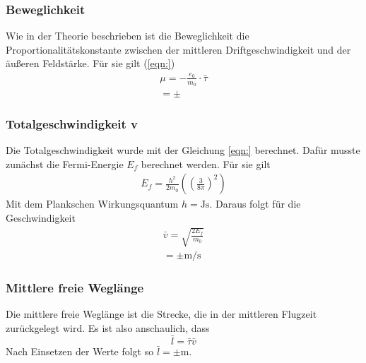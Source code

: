 \subsubsection{Beweglichkeit}

Wie in der Theorie beschrieben ist die Beweglichkeit die Proportionalitätskonstante zwischen 
der mittleren Driftgeschwindigkeit und der äußeren Feldstärke. Für sie gilt (\eqref{eqn:})
\begin{align*}
\mu = -\frac{e_0}{m_0} \cdot \bar{\tau} \\
= \pm
\end{align*}

\subsubsection{Totalgeschwindigkeit v}

Die Totalgeschwindigkeit wurde mit der Gleichung \eqref{eqn:} berechnet.
Dafür musste zunächst die Fermi-Energie $E_f$ berechnet werden. Für sie gilt
\begin{align}
E_f = \frac{h^2}{2 m_0} \left( \left( \frac{3}{8 \pi} \right)^2 \right)
\end{align}
Mit dem Plankschen Wirkungsquantum $h = \si{\joule\s}$.
Daraus folgt für die Geschwindigkeit
\begin{align*}
\bar{v} = \sqrt{ \frac{2 E_f}{m_0}} \\
= \pm \si{\m\per\s}
\end{align*}

\subsubsection{Mittlere freie Weglänge}

Die mittlere freie Weglänge ist die Strecke, die in der mittleren Flugzeit
zurückgelegt wird. Es ist also anschaulich, dass 
\begin{equation}
\bar{l} = \bar{ \tau } \bar{v}
\end{equation}
Nach Einsetzen der Werte folgt so $\bar{l} = \pm \si{\m}$.
